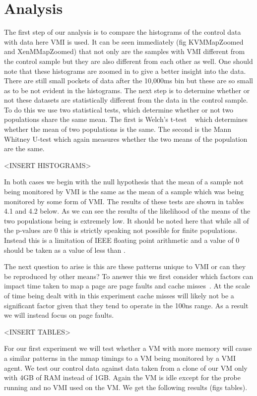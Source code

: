 \section{Analysis}

The first step of our analysis is to compare the histograms of the control data with data here VMI is used.  It can be seen immediately (fig KVMMapZoomed and XenMMapZoomed) that not only are the samples with VMI different from the control sample but they are also different from each other as well. One should note that these histograms are zoomed in to give a better insight into the data. There are still small pockets of data after the 10,000ms bin but these are so small as to be not evident in the histograms.  The next step is to determine whether or not these datasets are statistically different from the data in the control sample. To do this we use two statistical tests, which determine whether or not two populations share the same mean. The first is Welch's t-test ~\cite{welch_generalization_1947} which determines whether the mean of two populations is the same. The second is the Mann Whitney U-test which again measures whether the two means of the population are the same.


<INSERT HISTOGRAMS>\tabularnewline
\tabularnewline

In both cases we begin with the null hypothesis that the mean of a sample not being monitored by VMI is the same as the mean of a sample which was being monitored by some form of VMI. The results of these tests are shown in tables 4.1 and 4.2 below. 
As we can see the results of the likelihood of the means of the two populations being is extremely low. It should be noted here that while all of the p-values are 0 this is strictly speaking not possible for finite populations. Instead this is a limitation of IEEE floating point arithmetic and a value of 0 should be taken as a value of less than  . 


The next question to arise is this are these patterns unique to VMI or can they be reproduced by other means? To answer this we first consider which factors can impact time taken to map a page are page faults and cache misses~\cite{bryant_computer_2003}.  At the scale of time being dealt with in this experiment   cache misses will likely not be a significant factor given that they tend to operate in the 100ns range. As a result we will instead focus on page faults. 

<INSERT TABLES>\tabularnewline
\tabularnewline


For our first experiment we will test whether a VM with more memory will cause a similar patterns in the mmap timings to a VM  being monitored by a VMI agent. We test our control data against data taken from a clone of our VM only with 4GB of RAM instead of 1GB. Again the VM is idle except for the probe running and no VMI used on the VM. We get the following results (figs tables). 

